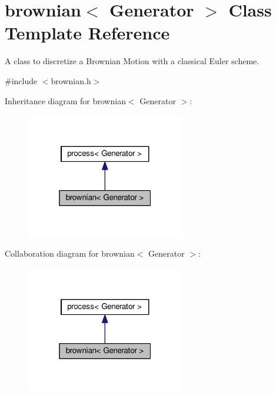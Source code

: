 \hypertarget{classbrownian}{}\section{brownian$<$ Generator $>$ Class Template Reference}
\label{classbrownian}


A class to discretize a Brownian Motion with a classical Euler scheme.  




{\ttfamily \#include $<$brownian.\+h$>$}



Inheritance diagram for brownian$<$ Generator $>$\+:\nopagebreak
\begin{figure}[H]
\begin{center}
\leavevmode
\includegraphics[width=196pt]{classbrownian__inherit__graph}
\end{center}
\end{figure}


Collaboration diagram for brownian$<$ Generator $>$\+:\nopagebreak
\begin{figure}[H]
\begin{center}
\leavevmode
\includegraphics[width=196pt]{classbrownian__coll__graph}
\end{center}
\end{figure}
